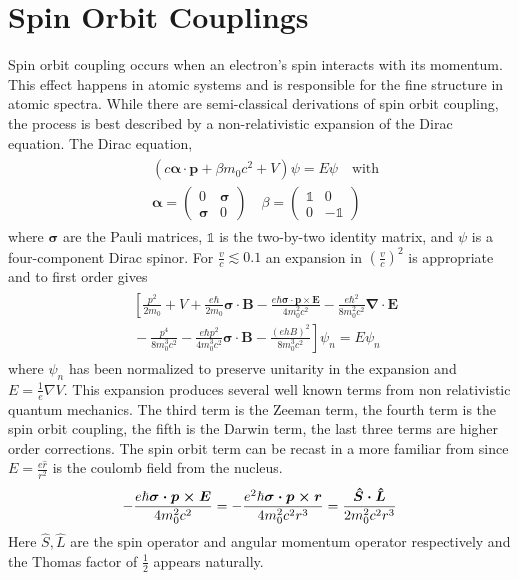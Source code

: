 \documentclass[12pt]{article}
\newcommand{\newln}{\\&{}}
\begin{document}
\section{Spin Orbit Couplings}
Spin orbit coupling occurs when an electron's spin interacts with its momentum.
This effect happens in atomic systems and is responsible for the fine structure in atomic spectra.
While there are semi-classical derivations of spin orbit coupling, the process is best described by a non-relativistic expansion of the Dirac equation\cite{Winkler}.
The Dirac equation,
\begin{align}\begin{split}
  & (c\boldsymbol{\alpha\cdot p}+\beta m_{0}c^2+V)\psi=E\psi \quad\text{with}\newln\boldsymbol{\alpha}=\left(\begin{array}{cc} 0 & \boldsymbol{\sigma} \\ \boldsymbol{\sigma} & 0 \end{array} \right) \quad \beta=\left(\begin{array}{cc} \mathbb{1} & 0 \\ 0 & -\mathbb{1} \end{array} \right)
\end{split}\end{align}
where $\boldsymbol\sigma$ are the Pauli matrices, $\mathbb{1}$ is the two-by-two identity matrix, and $\psi$ is a four-component Dirac spinor.
For $\frac{v}{c}\lesssim 0.1$ an expansion in $(\frac{v}{c})^2$ is appropriate and  to first order gives
\begin{align}\begin{split}
  & \left [ \frac{p^2}{2m_0}\right.+V+\frac{e\hbar}{2m_0}\boldsymbol{\sigma\cdot B}-\frac{e\hbar\boldsymbol{\sigma\cdot p \times E}}{4m_0^2c^2}-\frac{e\hbar^2}{8m_0^2c^2}\boldsymbol{\nabla\cdot E} \newln-\frac{p^4}{8m_0^3c^2}-\frac{e\hbar p^2}{4m_0^3c^2}\boldsymbol{\sigma \cdot B}-\left.\frac{(ehB)^2}{8m_0^3c^2}\right]\psi_n=E\psi_n
\end{split}\end{align}
where $\psi_n$ has been normalized to preserve unitarity in the expansion and $E=\frac{1}{e}\nabla V$.
This expansion produces several well known terms from non relativistic quantum mechanics.
The third term is the Zeeman term, the fourth term is the spin orbit coupling, the fifth is the Darwin term, the last three terms are higher order corrections.
The spin orbit term can be recast in a more familiar from since $E=\frac{e\hat{r}}{r^2}$ is the coulomb field from the nucleus.
\begin{align}
  -\frac{e\hbar\boldsymbol{\sigma\cdot p \times E}}{4m_0^2c^2}=-\frac{e^2\hbar\boldsymbol{\sigma\cdot p \times r}}{4m_0^2c^2r^3}\newline=\frac{\boldsymbol{\hat{S}\cdot \hat{L}}}{2m_0^2c^2r^3}
\end{align}
Here $\hat{S}, \hat{L}$ are the spin operator and angular momentum operator respectively and the Thomas factor of $\frac{1}{2}$ appears naturally.
\end{document}
